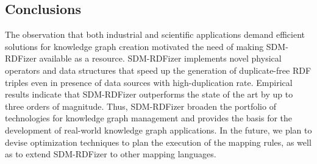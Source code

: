 \subsection{Conclusions}

The observation that both industrial and scientific applications demand efficient solutions for knowledge graph creation motivated the need of making SDM-RDFizer available as a resource. SDM-RDFizer implements novel physical operators and data structures that speed up the generation of duplicate-free RDF triples even in presence of data sources with high-duplication rate. Empirical results indicate that SDM-RDFizer outperforms the state of the art by up to three orders of magnitude. Thus, SDM-RDFizer broaden the portfolio of technologies for knowledge graph management and provides the basis for the development of real-world knowledge graph applications. In the future, we plan to devise optimization techniques to plan the execution of the mapping rules, as well as to extend SDM-RDFizer to other mapping languages.